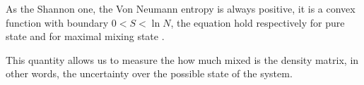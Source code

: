 As the Shannon one, the Von Neumann entropy is always positive, it is a convex function with boundary  $0<S < \ln N$, the equation hold respectively for pure state and for maximal mixing state \cite{Nielsen_Chuang_2010}.

This quantity allows us to measure the how much mixed is the density matrix, in other words, the uncertainty over the possible state of the system.



\begin{comment}
    \subsection{Stochastic Weight}
    
    Let retake the eq. \eqref{master_eq}, if we do not know the exact probability transition or if it changes randomly by time we can consider how system as if it is submerged in a thermal bath that changes randomly the probability transitions. This can be seen as add a stochastic operator $\hat \xi_t$ and a pseudo-temperature $T$ in the master equation with Dirac notation
    \begin{equation}
    \frac{d}{dt}\ket{\psi} = - \frac{1}{2}\left(\hat L + \sqrt{2T}\hat \xi_t\right) \ket{\psi}.
\end{equation}

Let be $\hat \xi_t$ an operator that has the same eigenvector of $\hat L$ but the respective eigenvalue are chosen randomly from a gaussian distribution with zero mean and unitary variance, so each eigenvector is independent from the other (the covariance of $\hat \xi_t$ is diagonal) but the probability transition $\pi_{ij}$ are not.

If we diagonalize the system it can be written as
\begin{equation}
\frac{d}{dt}\ket{\psi} = -\sum_\lambda \frac{1}{2}\left(\lambda + \sqrt{2T} \xi_{\lambda,t}\right) \ket{\lambda},
\end{equation}
where $\xi_{\lambda,t}$ is a white noise at time $t$ for the eigenstate $\ket{\lambda}$. To preserve the norm of the state the fluctuations can not act on the null eigenstate, so $\sum_\lambda\xi_{\lambda,t} = 0$.

Since all the eigenstate are independent, we can separate it in different equation
\begin{equation}
\frac{d}{dt}c_\lambda(t)\ket{\lambda} = -\frac{1}{2}\left(\lambda + \sqrt{2T} \xi_{\lambda,t}\right) c_\lambda(t)\ket{\lambda},
\end{equation}
This equation can be transform in a stochastic different equation
\begin{equation}
dc_\lambda(t) = -\frac{1}{2}\left(\lambda dt + \sqrt{2T} dW_t\right) c_\lambda(t),
\end{equation}
where $dW_t$ is the Weiner process. 

Since the solution of this type of stochastic differential equation satisfies the Fokker-Plank equation and the F-P satisfies the maximal entropy principle, the solution must maximize the Von Neumann entropy at given temperature $T$.
\end{comment}


